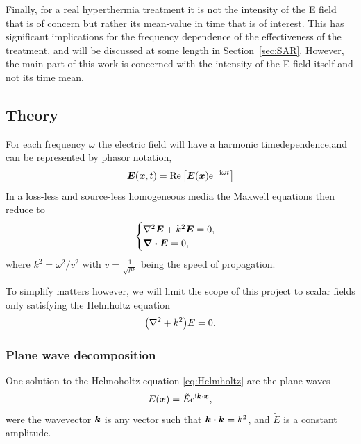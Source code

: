 \documentclass[11pt,a4paper, 
swedish,english %
]{article}
\begin{document}

Finally, for a real hyperthermia treatment it is not the intensity of the E field that is of concern but rather its mean-value in time that is of interest. This has significant implications for the frequency dependence of the effectiveness of the treatment, and will be discussed at some length in Section~\ref{sec:SAR}. However, the main part of this work is concerned with the intensity of the E field itself and not its time mean.


\subsection{Theory}
For each frequency $\omega$ the electric field will have a harmonic timedependence,and can be represented by phasor notation,
\begin{equation}
  \label{eq:phasor}
\vb*E(\vb*x,t)=\Re\qty[\vb*E(\vb*x)\ee^{-\ii\omega t}]%
\end{equation}
In a loss-less and source-less homogeneous media the Maxwell equations then reduce to
\begin{equation}
\begin{cases}
\laplacian  \vb*E + k^2\vb*E=0,\\
\div\vb*E = 0,
\end{cases}
\end{equation} 
where $k^2 = \omega^2/v^2$ with $v=\frac{1}{\sqrt{\mu \epsilon}}$ being the speed of propagation. 

To simplify matters however, we will limit the scope of this project to scalar fields only satisfying the Helmholtz equation
\begin{equation}
  \label{eq:Helmholtz}
  \qty(\laplacian + k^2)E=0.
\end{equation} 

\subsubsection{Plane wave decomposition}
One solution to the Helmoholtz equation \eqref{eq:Helmholtz} are the plane waves
\begin{equation}\label{eq:plane-wave}
E(\vb*x)=\tilde{E} \mathrm{e}^{\mathrm{i}\vb*k \cdot \vb*x},
\end{equation}
were the wavevector $\vb*k$ is any vector such that $\vb*k\vdot\vb*k=k^2$, and $\tilde{E}$ is a constant amplitude. 
\end{document}

